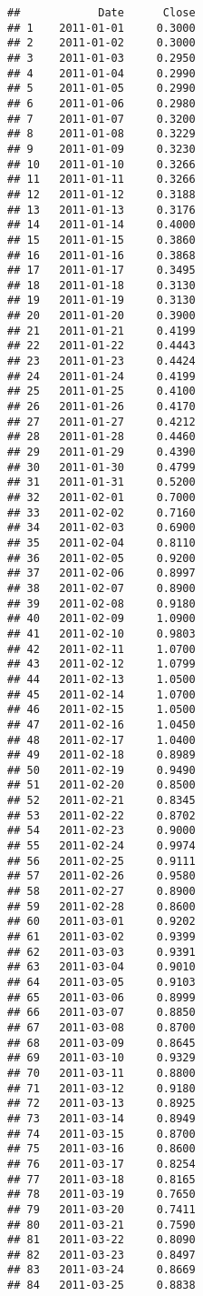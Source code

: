 \documentclass[
]{article}
\begin{document}
\begin{verbatim}
##            Date      Close
## 1    2011-01-01     0.3000
## 2    2011-01-02     0.3000
## 3    2011-01-03     0.2950
## 4    2011-01-04     0.2990
## 5    2011-01-05     0.2990
## 6    2011-01-06     0.2980
## 7    2011-01-07     0.3200
## 8    2011-01-08     0.3229
## 9    2011-01-09     0.3230
## 10   2011-01-10     0.3266
## 11   2011-01-11     0.3266
## 12   2011-01-12     0.3188
## 13   2011-01-13     0.3176
## 14   2011-01-14     0.4000
## 15   2011-01-15     0.3860
## 16   2011-01-16     0.3868
## 17   2011-01-17     0.3495
## 18   2011-01-18     0.3130
## 19   2011-01-19     0.3130
## 20   2011-01-20     0.3900
## 21   2011-01-21     0.4199
## 22   2011-01-22     0.4443
## 23   2011-01-23     0.4424
## 24   2011-01-24     0.4199
## 25   2011-01-25     0.4100
## 26   2011-01-26     0.4170
## 27   2011-01-27     0.4212
## 28   2011-01-28     0.4460
## 29   2011-01-29     0.4390
## 30   2011-01-30     0.4799
## 31   2011-01-31     0.5200
## 32   2011-02-01     0.7000
## 33   2011-02-02     0.7160
## 34   2011-02-03     0.6900
## 35   2011-02-04     0.8110
## 36   2011-02-05     0.9200
## 37   2011-02-06     0.8997
## 38   2011-02-07     0.8900
## 39   2011-02-08     0.9180
## 40   2011-02-09     1.0900
## 41   2011-02-10     0.9803
## 42   2011-02-11     1.0700
## 43   2011-02-12     1.0799
## 44   2011-02-13     1.0500
## 45   2011-02-14     1.0700
## 46   2011-02-15     1.0500
## 47   2011-02-16     1.0450
## 48   2011-02-17     1.0400
## 49   2011-02-18     0.8989
## 50   2011-02-19     0.9490
## 51   2011-02-20     0.8500
## 52   2011-02-21     0.8345
## 53   2011-02-22     0.8702
## 54   2011-02-23     0.9000
## 55   2011-02-24     0.9974
## 56   2011-02-25     0.9111
## 57   2011-02-26     0.9580
## 58   2011-02-27     0.8900
## 59   2011-02-28     0.8600
## 60   2011-03-01     0.9202
## 61   2011-03-02     0.9399
## 62   2011-03-03     0.9391
## 63   2011-03-04     0.9010
## 64   2011-03-05     0.9103
## 65   2011-03-06     0.8999
## 66   2011-03-07     0.8850
## 67   2011-03-08     0.8700
## 68   2011-03-09     0.8645
## 69   2011-03-10     0.9329
## 70   2011-03-11     0.8800
## 71   2011-03-12     0.9180
## 72   2011-03-13     0.8925
## 73   2011-03-14     0.8949
## 74   2011-03-15     0.8700
## 75   2011-03-16     0.8600
## 76   2011-03-17     0.8254
## 77   2011-03-18     0.8165
## 78   2011-03-19     0.7650
## 79   2011-03-20     0.7411
## 80   2011-03-21     0.7590
## 81   2011-03-22     0.8090
## 82   2011-03-23     0.8497
## 83   2011-03-24     0.8669
## 84   2011-03-25     0.8838

\end{verbatim}
\end{document}
